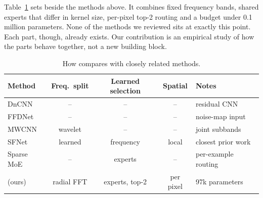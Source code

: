 Table~\ref{tab:gap} sets \fcsg{} beside the methods above. It combines fixed
frequency bands, shared experts that differ in kernel size, per-pixel top-2
routing and a budget under 0.1 million parameters. None of the methods we
reviewed sits at exactly this point. Each part, though, already exists. Our
contribution is an empirical study of how the parts behave together, not a
new building block.

\begin{table}[htbp]
	\centering
	\caption{How \fcsg{} compares with closely related methods.}
	\small
	\label{tab:gap}
	\begin{tabular}{@{}lcccl@{}}
		\toprule
		Method & Freq.\ split & Learned selection & Spatial & Notes \\
		\midrule
		DnCNN \cite{zhang2017dncnn}      & --         & --              & --        & residual CNN \\
		FFDNet \cite{zhang2018ffdnet}    & --         & --              & --        & noise-map input \\
		MWCNN \cite{liu2018mwcnn}        & wavelet    & --              & --        & joint subbands \\
		SFNet \cite{cui2023sfnet}        & learned    & frequency       & local     & closest prior work \\
		Sparse MoE \cite{shazeer2017moe} & --         & experts         & --        & per-example routing \\
		\fcsg{} (ours)                   & radial FFT & experts, top-2  & per pixel & 97k parameters \\
		\bottomrule
	\end{tabular}
\end{table}
